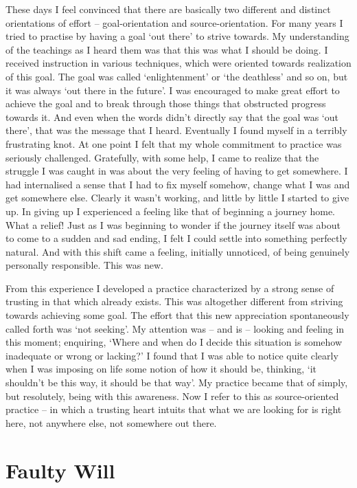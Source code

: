 These days I feel convinced that there are basically two different and
distinct orientations of effort -- goal-orientation and
source-orientation. For many years I tried to practise by having a goal
`out there' to strive towards. My understanding of the teachings as I
heard them was that this was what I should be doing. I received
instruction in various techniques, which were oriented towards
realization of this goal. The goal was called `enlightenment' or `the
deathless' and so on, but it was always `out there in the future'. I was
encouraged to make great effort to achieve the goal and to break through
those things that obstructed progress towards it. And even when the
words didn't directly say that the goal was `out there', that was the
message that I heard. Eventually I found myself in a terribly
frustrating knot. At one point I felt that my whole commitment to
practice was seriously challenged. Gratefully, with some help, I came to
realize that the struggle I was caught in was about the very feeling of
having to get somewhere. I had internalised a sense that I had to fix
myself somehow, change what I was and get somewhere else. Clearly it
wasn't working, and little by little I started to give up.
In giving up I experienced a feeling like
that of beginning a journey home. What a relief! Just as I was beginning
to wonder if the journey itself was about to come to a sudden and sad
ending, I felt I could settle into something perfectly natural. And with
this shift came a feeling, initially unnoticed, of being genuinely
personally responsible. This was new.

From this experience I developed a practice characterized by a strong
sense of trusting in that which already exists. This was altogether
different from striving towards achieving some goal. The effort that
this new appreciation spontaneously called forth was `not seeking'. My
attention was -- and is -- looking and feeling in this moment;
enquiring, `Where and when do I decide this situation is somehow
inadequate or wrong or lacking?' I found that I was able to notice quite
clearly when I was imposing on life some notion of how it should be,
thinking, `it shouldn't be this way, it should be that way'. My practice
became that of simply, but resolutely, being with this awareness. Now I
refer to this as source-oriented practice -- in which a trusting heart
intuits that what we are looking for is right here, not anywhere else,
not somewhere out there.

\section{Faulty Will}


